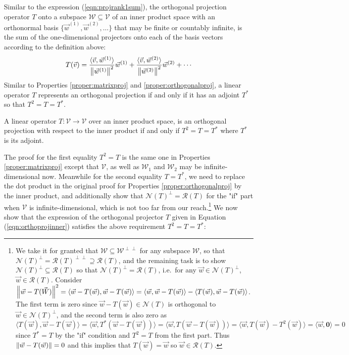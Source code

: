 Similar to the expression (\ref{eqn:projrank1sum}), the orthogonal projection operator $T$ onto a subspace $\mathcal{W} \subseteq \mathcal{V}$ of an inner product space with an orthonormal basis $\{\vec{w}^{(1)}, \vec{w}^{(2)}, \ldots\}$ that may be finite or countably infinite, is the sum of the one-dimensional projectors onto each of the basis vectors according to the definition above:
\begin{align}
T(\vec{v}) = \frac{\langle \vec{v}, \vec{w}^{(1)}\rangle}{\norm{\vec{w}^{(1)}}^2} \vec{w}^{(1)} + \frac{\langle \vec{v}, \vec{w}^{(2)}\rangle}{\norm{\vec{w}^{(2)}}^2} \vec{w}^{(2)} + \cdots \label{eqn:orthoprojinner}
\end{align}
Similar to Properties \ref{proper:matrixproj} and \ref{proper:orthogonalproj}, a linear operator $T$ represents an orthogonal projection if and only if it has an adjoint $T^*$ so that $T^2 = T = T^*$.
\begin{proper}
\label{proper:orthoprojadjoint}
A linear operator $T: \mathcal{V} \to \mathcal{V}$ over an inner product space, is an orthogonal projection with respect to the inner product if and only if $T^2 = T = T^*$ where $T^*$ is its adjoint.
\end{proper}
The proof for the first equality $T^2 = T$ is the same one in Properties \ref{proper:matrixproj} except that $\mathcal{V}$, as well as $\mathcal{W}_1$ and $\mathcal{W}_2$ may be infinite-dimensional now. Meanwhile for the second equality $T = T^*$, we need to replace the dot product in the original proof for Properties \ref{proper:orthogonalproj} by the inner product, and additionally show that $\mathcal{N}(T)^\perp = \mathcal{R}(T)$ for the "if" part when $\mathcal{V}$ is infinite-dimensional, which is not too far from our reach.\footnote{We take it for granted that $\mathcal{W} \subseteq \mathcal{W}^{\perp\perp}$ for any subspace $\mathcal{W}$, so that $\mathcal{N}(T)^\perp = \mathcal{R}(T)^{\perp\perp} \supseteq \mathcal{R}(T)$, and the remaining task is to show $\mathcal{N}(T)^\perp \subseteq \mathcal{R}(T)$ so that $\mathcal{N}(T)^\perp = \mathcal{R}(T)$, i.e.\ for any $\vec{w} \in \mathcal{N}(T)^\perp$, $\vec{w} \in \mathcal{R}(T)$. Consider $\norm{\vec{w} - T(\vec{W})}^2 = \langle \vec{w} - T(\vec{w}), \vec{w} - T(\vec{w}) \rangle = \langle \vec{w}, \vec{w} - T(\vec{w}) \rangle - \langle T(\vec{w}), \vec{w} - T(\vec{w}) \rangle$. The first term is zero since $\vec{w} - T(\vec{w}) \in \mathcal{N}(T)$ is orthogonal to $\vec{w} \in \mathcal{N}(T)^\perp$, and the second term is also zero as $\langle T(\vec{w}), \vec{w} - T(\vec{w}) \rangle = \langle \vec{w}, T^*(\vec{w} - T(\vec{w})) \rangle = \langle \vec{w}, T(\vec{w} - T(\vec{w})) \rangle = \langle \vec{w}, T(\vec{w}) - T^2(\vec{w}) \rangle = \langle \vec{w}, \textbf{0} \rangle = 0$ since $T^* = T$ by the "if" condition and $T^2 = T$ from the first part. Thus $\norm{\vec{w} - T(\vec{w})} = 0$ and this implies that $T(\vec{w}) = \vec{w}$ so $\vec{w} \in \mathcal{R}(T)$.} We now show that the expression of the orthogonal projector $T$ given in Equation (\ref{eqn:orthoprojinner}) satisfies the above requirement $T^2 = T = T^*$:
